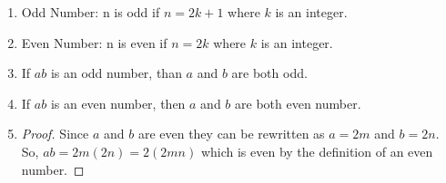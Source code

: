 \documentclass{article}
\begin{document}

\begin{enumerate}
	\item Odd Number: n is odd if $n = 2k+1$ where $k$ is an integer.
	\item Even Number: n is even if $n = 2k$ where $k$ is an integer.
	\item If $ab$ is an odd number, than $a$ and $b$ are both odd.
	\item If $ab$ is an even number, then $a$ and $b$ are both even number. 
	\item 
	\begin{proof}Since $a$ and $b$ are even they can be rewritten as $a = 2m$ and $b = 2n$.\\ So, $ab = 2m(2n) = 2(2mn)$ which is even by the definition of an even number.
	\end{proof} 
\end{enumerate}

\end{document}
